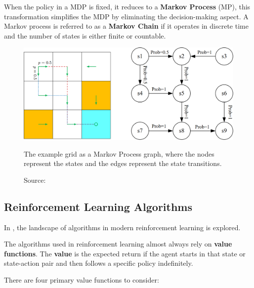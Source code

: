 When the policy in a MDP is fixed, it reduces to a \textbf{Markov Process} (MP),
this transformation simplifies the MDP by eliminating the decision-making aspect. 
A Markov process is referred to as a \textbf{Markov Chain} if it operates in discrete
time and the number of states is either finite or countable.

\begin{figure}[h]
    \centering
    \includegraphics[width=.75\textwidth]{figures/ch3/3.mdp.png}
    \caption{The example grid as a Markov Process graph, where the nodes
    represent the states and the edges represent the state transitions.}
    \vspace{-10px}
    \caption*{\scriptsize{Source: \cite{zhao2024RLBook}}}
    \label{fig:mdp}
\end{figure}


\subsection{Reinforcement Learning Algorithms}

In \cite{openaiPartKinds}, the landscape of algorithms in modern reinforcement
learning is explored.

The algorithms used in reinforcement learning almost always rely on
\textbf{value functions}.
The \textbf{value} is the expected return if the agent starts in
that state or state-action pair and then follows a specific policy indefinitely.

\vspace{5cm}

There are four primary value functions to consider:

